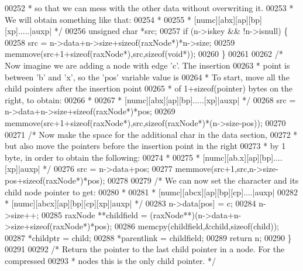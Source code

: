 \begin{DoxyCode}
{00252 \textcolor{comment}{     * so that we can mess with the other data without overwriting it.}
00253 \textcolor{comment}{     * We will obtain something like that:}
00254 \textcolor{comment}{     *}
00255 \textcolor{comment}{     * [numc][abx][ap][bp][xp].....|auxp| */}
00256     \textcolor{keywordtype}{unsigned} \textcolor{keywordtype}{char} *src;
00257     \textcolor{keywordflow}{if} (n->iskey && !n->isnull) \{
00258         src = n->data+n->size+\textcolor{keyword}{sizeof}(raxNode*)*n->size;
00259         memmove(src+1+\textcolor{keyword}{sizeof}(raxNode*),src,\textcolor{keyword}{sizeof}(\textcolor{keywordtype}{void}*));
00260     \}
00261 
00262     \textcolor{comment}{/* Now imagine we are adding a node with edge 'c'. The insertion}
00263 \textcolor{comment}{     * point is between 'b' and 'x', so the 'pos' variable value is}
00264 \textcolor{comment}{     * To start, move all the child pointers after the insertion point}
00265 \textcolor{comment}{     * of 1+sizeof(pointer) bytes on the right, to obtain:}
00266 \textcolor{comment}{     *}
00267 \textcolor{comment}{     * [numc][abx][ap][bp].....[xp]|auxp| */}
00268     src = n->data+n->size+\textcolor{keyword}{sizeof}(raxNode*)*pos;
00269     memmove(src+1+\textcolor{keyword}{sizeof}(raxNode*),src,\textcolor{keyword}{sizeof}(raxNode*)*(n->size-pos));
00270 
00271     \textcolor{comment}{/* Now make the space for the additional char in the data section,}
00272 \textcolor{comment}{     * but also move the pointers before the insertion point in the right}
00273 \textcolor{comment}{     * by 1 byte, in order to obtain the following:}
00274 \textcolor{comment}{     *}
00275 \textcolor{comment}{     * [numc][ab.x][ap][bp]....[xp]|auxp| */}
00276     src = n->data+pos;
00277     memmove(src+1,src,n->size-pos+\textcolor{keyword}{sizeof}(raxNode*)*pos);
00278 
00279     \textcolor{comment}{/* We can now set the character and its child node pointer to get:}
00280 \textcolor{comment}{     *}
00281 \textcolor{comment}{     * [numc][abcx][ap][bp][cp]....|auxp|}
00282 \textcolor{comment}{     * [numc][abcx][ap][bp][cp][xp]|auxp| */}
00283     n->data[pos] = c;
00284     n->size++;
00285     raxNode **childfield = (raxNode**)(n->data+n->size+\textcolor{keyword}{sizeof}(raxNode*)*pos);
00286     memcpy(childfield,&child,\textcolor{keyword}{sizeof}(child));
00287     *childptr = child;
00288     *parentlink = childfield;
00289     \textcolor{keywordflow}{return} n;
00290 \}
00291 
00292 \textcolor{comment}{/* Return the pointer to the last child pointer in a node. For the compressed}
00293 \textcolor{comment}{ * nodes this is the only child pointer. */}
}
\end{DoxyCode}
